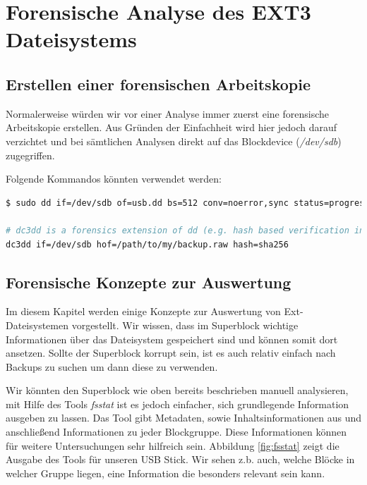 \newpage

\section{Forensische Analyse des EXT3 Dateisystems}

\subsection{Erstellen einer forensischen Arbeitskopie}

Normalerweise würden wir vor einer Analyse immer zuerst eine forensische Arbeitskopie erstellen. Aus Gründen der Einfachheit wird hier jedoch darauf verzichtet und bei sämtlichen Analysen direkt auf das Blockdevice (\textit{/dev/sdb}) zugegriffen.

Folgende Kommandos könnten verwendet werden:

\begin{lstlisting}[language=bash]
$ sudo dd if=/dev/sdb of=usb.dd bs=512 conv=noerror,sync status=progress

# dc3dd is a forensics extension of dd (e.g. hash based verification integrated)
dc3dd if=/dev/sdb hof=/path/to/my/backup.raw hash=sha256
\end{lstlisting}


\subsection{Forensische Konzepte zur Auswertung}

Im diesem Kapitel werden einige Konzepte zur Auswertung von Ext-Dateisystemen vorgestellt. Wir wissen, dass im Superblock wichtige Informationen über das Dateisystem gespeichert sind und können somit dort ansetzen. Sollte der Superblock korrupt sein, ist es auch relativ einfach nach Backups zu suchen um dann diese zu verwenden.

Wir könnten den Superblock wie oben bereits beschrieben manuell analysieren, mit Hilfe des Tools \textit{fsstat} ist es  jedoch einfacher, sich grundlegende Information ausgeben zu lassen. Das Tool gibt Metadaten, sowie Inhaltsinformationen aus und anschließend Informationen zu jeder Blockgruppe. Diese Informationen können für weitere Untersuchungen sehr hilfreich sein. Abbildung \ref{fig:fsstat} zeigt die Ausgabe des Tools für unseren USB Stick. Wir sehen z.b. auch, welche Blöcke in welcher Gruppe liegen, eine Information die besonders relevant sein kann.

